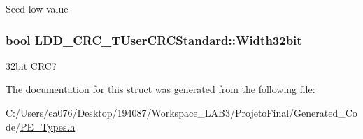 Seed low value \hypertarget{struct_l_d_d___c_r_c___t_user_c_r_c_standard_a82a24fa9104800759f278afc36a4e00e}{
\subsubsection[{Width32bit}]{\setlength{\rightskip}{0pt plus 5cm}bool L\-D\-D\-\_\-\-C\-R\-C\-\_\-\-T\-User\-C\-R\-C\-Standard\-::\-Width32bit}}\label{struct_l_d_d___c_r_c___t_user_c_r_c_standard_a82a24fa9104800759f278afc36a4e00e}
32bit C\-R\-C? 

The documentation for this struct was generated from the following file\-:\begin{DoxyCompactItemize}
\item 
C\-:/\-Users/ea076/\-Desktop/194087/\-Workspace\-\_\-\-L\-A\-B3/\-Projeto\-Final/\-Generated\-\_\-\-Code/\hyperlink{_p_e___types_8h}{P\-E\-\_\-\-Types.\-h}\end{DoxyCompactItemize}
